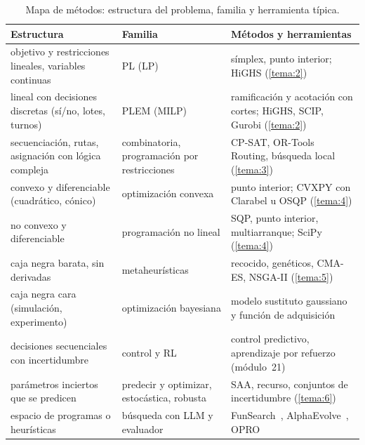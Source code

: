 \begin{table}[h]
\centering\small
\caption{Mapa de métodos: estructura del problema, familia y herramienta típica.}\label{tab:mapa}
\begin{tabularx}{\textwidth}{@{}>{\raggedright\arraybackslash}p{3.5cm}>{\raggedright\arraybackslash}p{3.1cm}>{\raggedright\arraybackslash}X@{}}
\toprule
Estructura & Familia & Métodos y herramientas \\
\midrule
objetivo y restricciones lineales, variables continuas & PL (LP) & símplex, punto interior; HiGHS (\cref{tema:2}) \\
lineal con decisiones discretas (sí/no, lotes, turnos) & PLEM (MILP) & ramificación y acotación con cortes; HiGHS, SCIP, Gurobi (\cref{tema:2}) \\
secuenciación, rutas, asignación con lógica compleja & combinatoria, programación por restricciones & CP-SAT, OR-Tools Routing, búsqueda local (\cref{tema:3}) \\
convexo y diferenciable (cuadrático, cónico) & optimización convexa & punto interior; CVXPY con Clarabel u OSQP (\cref{tema:4}) \\
no convexo y diferenciable & programación no lineal & SQP, punto interior, multiarranque; SciPy (\cref{tema:4}) \\
caja negra barata, sin derivadas & metaheurísticas & recocido, genéticos, CMA-ES, NSGA-II (\cref{tema:5}) \\
caja negra cara (simulación, experimento) & optimización bayesiana & modelo sustituto gaussiano y función de adquisición~\cite{garnett,frazier} \\
decisiones secuenciales con incertidumbre & control y RL & control predictivo, aprendizaje por refuerzo (módulo~21)~\cite{sb} \\
parámetros inciertos que se predicen & predecir y optimizar, estocástica, robusta & SAA, recurso, conjuntos de incertidumbre (\cref{tema:6}) \\
espacio de programas o heurísticas & búsqueda con LLM y evaluador & FunSearch~\cite{funsearch}, AlphaEvolve~\cite{alphaevolve}, OPRO~\cite{opro} \\
\bottomrule
\end{tabularx}
\end{table}

\addtocounter{figure}{1}%


